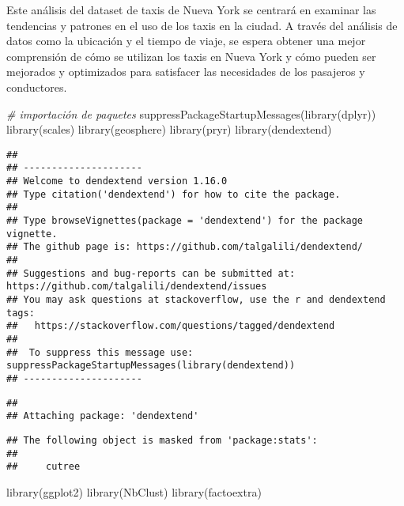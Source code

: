 \documentclass[
]{article}
\newenvironment{Shaded}{\begin{snugshade}}{\end{snugshade}}
\newcommand{\CommentTok}[1]{\textcolor[rgb]{0.56,0.35,0.01}{\textit{#1}}}
\newcommand{\FunctionTok}[1]{\textcolor[rgb]{0.00,0.00,0.00}{#1}}
\newcommand{\NormalTok}[1]{#1}
\begin{document}
Este análisis del dataset de taxis de Nueva York se centrará en examinar
las tendencias y patrones en el uso de los taxis en la ciudad. A través
del análisis de datos como la ubicación y el tiempo de viaje, se espera
obtener una mejor comprensión de cómo se utilizan los taxis en Nueva
York y cómo pueden ser mejorados y optimizados para satisfacer las
necesidades de los pasajeros y conductores.

\begin{Shaded}
\begin{Highlighting}[]
\CommentTok{\# importación de paquetes}
\FunctionTok{suppressPackageStartupMessages}\NormalTok{(}\FunctionTok{library}\NormalTok{(dplyr))}
\FunctionTok{library}\NormalTok{(scales)}
\FunctionTok{library}\NormalTok{(geosphere)}
\FunctionTok{library}\NormalTok{(pryr)}
\FunctionTok{library}\NormalTok{(dendextend)}
\end{Highlighting}
\end{Shaded}

\begin{verbatim}
## 
## ---------------------
## Welcome to dendextend version 1.16.0
## Type citation('dendextend') for how to cite the package.
## 
## Type browseVignettes(package = 'dendextend') for the package vignette.
## The github page is: https://github.com/talgalili/dendextend/
## 
## Suggestions and bug-reports can be submitted at: https://github.com/talgalili/dendextend/issues
## You may ask questions at stackoverflow, use the r and dendextend tags: 
##   https://stackoverflow.com/questions/tagged/dendextend
## 
##  To suppress this message use:  suppressPackageStartupMessages(library(dendextend))
## ---------------------
\end{verbatim}

\begin{verbatim}
## 
## Attaching package: 'dendextend'
\end{verbatim}

\begin{verbatim}
## The following object is masked from 'package:stats':
## 
##     cutree
\end{verbatim}

\begin{Shaded}
\begin{Highlighting}[]
\FunctionTok{library}\NormalTok{(ggplot2)}
\FunctionTok{library}\NormalTok{(NbClust)}
\FunctionTok{library}\NormalTok{(factoextra)}
\end{Highlighting}
\end{Shaded}
\end{document}
